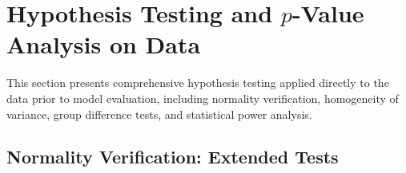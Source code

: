 \section{Hypothesis Testing and $p$-Value Analysis on Data}
\label{app:hypothesis_pvalues}

This section presents comprehensive hypothesis testing applied directly to the data prior to model evaluation, including normality verification, homogeneity of variance, group difference tests, and statistical power analysis.

\subsection{Normality Verification: Extended Tests}

